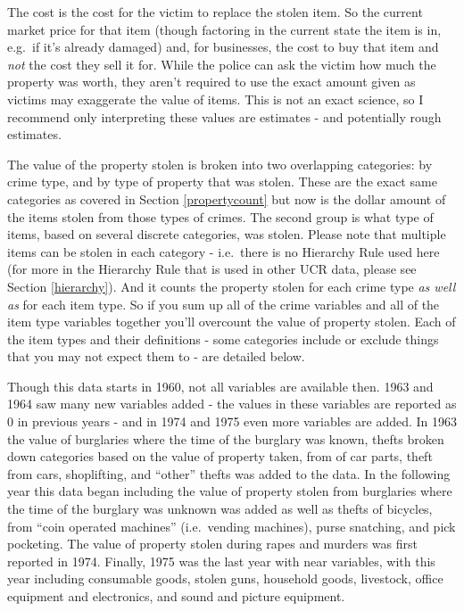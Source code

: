 \documentclass[
  12pt,
  openany]{book}
\begin{document}
The cost is the cost for the victim to replace the stolen item. So the current market price for that item (though factoring in the current state the item is in, e.g.~if it's already damaged) and, for businesses, the cost to buy that item and \emph{not} the cost they sell it for. While the police can ask the victim how much the property was worth, they aren't required to use the exact amount given as victims may exaggerate the value of items. This is not an exact science, so I recommend only interpreting these values are estimates - and potentially rough estimates.

The value of the property stolen is broken into two overlapping categories: by crime type, and by type of property that was stolen. These are the exact same categories as covered in Section \ref{propertycount} but now is the dollar amount of the items stolen from those types of crimes. The second group is what type of items, based on several discrete categories, was stolen. Please note that multiple items can be stolen in each category - i.e.~there is no Hierarchy Rule used here (for more in the Hierarchy Rule that is used in other UCR data, please see Section \ref{hierarchy}). And it counts the property stolen for each crime type \emph{as well as} for each item type. So if you sum up all of the crime variables and all of the item type variables together you'll overcount the value of property stolen. Each of the item types and their definitions - some categories include or exclude things that you may not expect them to - are detailed below.

Though this data starts in 1960, not all variables are available then. 1963 and 1964 saw many new variables added - the values in these variables are reported as 0 in previous years - and in 1974 and 1975 even more variables are added. In 1963 the value of burglaries where the time of the burglary was known, thefts broken down categories based on the value of property taken, from of car parts, theft from cars, shoplifting, and ``other'' thefts was added to the data. In the following year this data began including the value of property stolen from burglaries where the time of the burglary was unknown was added as well as thefts of bicycles, from ``coin operated machines'' (i.e.~vending machines), purse snatching, and pick pocketing. The value of property stolen during rapes and murders was first reported in 1974. Finally, 1975 was the last year with near variables, with this year including consumable goods, stolen guns, household goods, livestock, office equipment and electronics, and sound and picture equipment.
\end{document}
